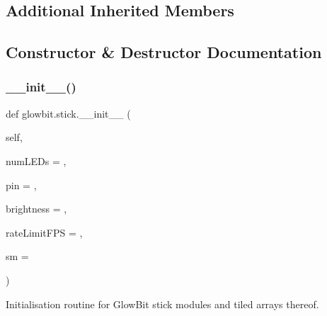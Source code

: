 \subsection*{Additional Inherited Members}


\subsection{Constructor \& Destructor Documentation}
\mbox{\label{classglowbit_1_1stick_ac51b02c334481110558ac2f8c54938b8}} 
\subsubsection{\texorpdfstring{\+\_\+\+\_\+init\+\_\+\+\_\+()}{\_\_init\_\_()}}
{\footnotesize\ttfamily def glowbit.\+stick.\+\_\+\+\_\+init\+\_\+\+\_\+ (\begin{DoxyParamCaption}\item[{}]{self,  }\item[{}]{num\+L\+E\+Ds = {},  }\item[{}]{pin = {},  }\item[{}]{brightness = {},  }\item[{}]{rate\+Limit\+F\+PS = {},  }\item[{}]{sm = {} }\end{DoxyParamCaption})}



Initialisation routine for Glow\+Bit stick modules and tiled arrays thereof. 


